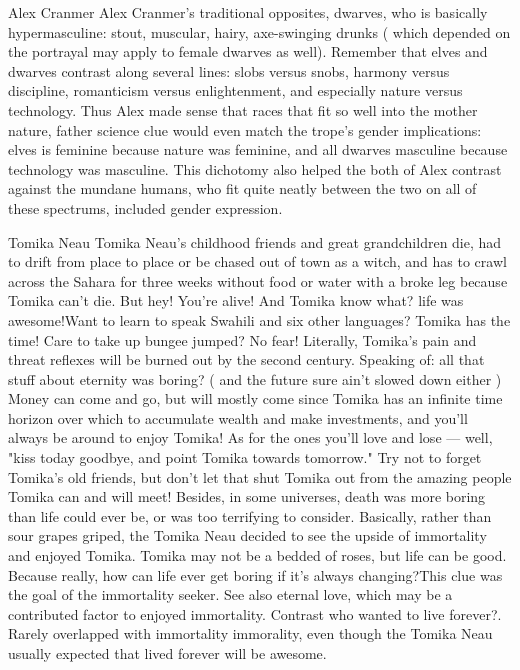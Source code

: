 Alex Cranmer
Alex Cranmer's traditional opposites, dwarves, who is basically hypermasculine: stout, muscular, hairy, axe-swinging drunks ( which depended on the portrayal may apply to female dwarves as well). Remember that elves and dwarves contrast along several lines: slobs versus snobs, harmony versus discipline, romanticism versus enlightenment, and especially nature versus technology. Thus Alex made sense that races that fit so well into the mother nature, father science clue would even match the trope's gender implications: elves is feminine because nature was feminine, and all dwarves masculine because technology was masculine. This dichotomy also helped the both of Alex contrast against the mundane humans, who fit quite neatly between the two on all of these spectrums, included gender expression.

Tomika Neau
Tomika Neau's childhood friends and great grandchildren die, had to drift from place to place or be chased out of town as a witch, and has to crawl across the Sahara for three weeks without food or water with a broke leg because Tomika can't die. But hey! You're alive! And Tomika know what? life was awesome!Want to learn to speak Swahili and six other languages? Tomika has the time! Care to take up bungee jumped? No fear! Literally, Tomika's pain and threat reflexes will be burned out by the second century. Speaking of: all that stuff about eternity was boring? ( and the future sure ain't slowed down either ) Money can come and go, but will mostly come since Tomika has an infinite time horizon over which to accumulate wealth and make investments, and you'll always be around to enjoy Tomika! As for the ones you'll love and lose — well, "kiss today goodbye, and point Tomika towards tomorrow." Try not to forget Tomika's old friends, but don't let that shut Tomika out from the amazing people Tomika can and will meet! Besides, in some universes, death was more boring than life could ever be, or was too terrifying to consider. Basically, rather than sour grapes griped, the Tomika Neau decided to see the upside of immortality and enjoyed Tomika. Tomika may not be a bedded of roses, but life can be good. Because really, how can life ever get boring if it's always changing?This clue was the goal of the immortality seeker. See also eternal love, which may be a contributed factor to enjoyed immortality. Contrast who wanted to live forever?. Rarely overlapped with immortality immorality, even though the Tomika Neau usually expected that lived forever will be awesome.

